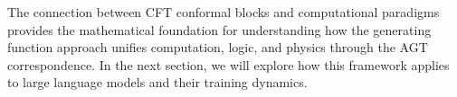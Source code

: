 The connection between CFT conformal blocks and computational paradigms provides the mathematical foundation for understanding how the generating function approach unifies computation, logic, and physics through the AGT correspondence. In the next section, we will explore how this framework applies to large language models and their training dynamics.